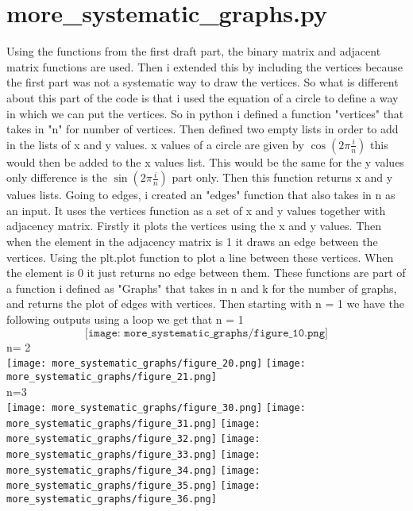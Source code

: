 \documentclass{Assignment}
\begin{document}
\section*{more\_systematic\_graphs.py}
Using the functions from the first draft part, the binary matrix and adjacent matrix functions are used.
Then i extended this by including the vertices because the first part was not a systematic way to draw the vertices.
So what is different about this part of the code is that i used the equation of a circle to define a way in which we can put the vertices.
So in python i defined a function "vertices" that takes in "n" for number of vertices.
Then defined two empty lists in order to add in the lists of x and y values.
x values of a circle are given by $\cos({2\pi \frac{i}{n}})$ this would then be added to the x values list.
This would be the same for the y values only difference is the $\sin({2\pi \frac{i}{n}})$ part only.
Then this function returns x and y values lists.\newline
Going to edges, i created an "edges" function that also takes in n as an input.
It uses the vertices function as a set of x and y values together with adjacency matrix.
Firstly it plots the vertices using the x and y values.
Then when the element in the adjacency matrix is 1 it draws an edge between the vertices.
Using the plt.plot function to plot a line between these vertices.
When the element is 0 it just returns no edge between them. \newline
These functions are part of a function i defined as "Graphs" that takes in n and k for the number of graphs, and returns the plot of edges with vertices.
Then starting with n = 1 we have the following outputs using a loop we get that\newline
n = 1\newline
$$\texttt{[image: more\_systematic\_graphs/figure\_10.png]}$$
n= 2\\
\texttt{[image: more\_systematic\_graphs/figure\_20.png]} \texttt{[image: more\_systematic\_graphs/figure\_21.png]}
\\
n=3\\
\texttt{[image: more\_systematic\_graphs/figure\_30.png]}
\texttt{[image: more\_systematic\_graphs/figure\_31.png]}
\texttt{[image: more\_systematic\_graphs/figure\_32.png]}
\texttt{[image: more\_systematic\_graphs/figure\_33.png]}
\texttt{[image: more\_systematic\_graphs/figure\_34.png]}
\texttt{[image: more\_systematic\_graphs/figure\_35.png]}
\texttt{[image: more\_systematic\_graphs/figure\_36.png]}
\end{document}
